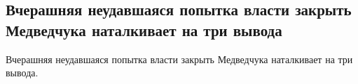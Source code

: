  
 
 
 
 
\subsection{Вчерашняя неудавшаяся попытка власти закрыть Медведчука наталкивает на три вывода}

Вчерашняя неудавшаяся попытка власти закрыть Медведчука наталкивает на три вывода.

